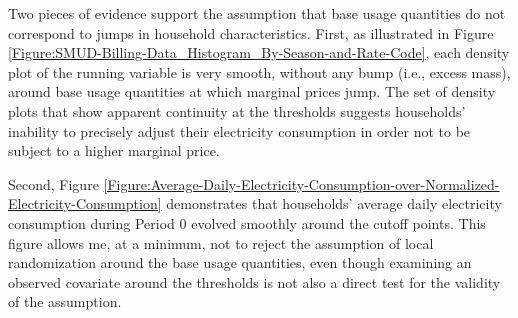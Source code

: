 Two pieces of evidence support the assumption that base usage quantities do not correspond to jumps in household characteristics. First, as illustrated in Figure \ref{Figure:SMUD-Billing-Data_Histogram_By-Season-and-Rate-Code}, each density plot of the running variable is very smooth, without any bump (i.e., excess mass), around base usage quantities at which marginal prices jump. The set of density plots that show apparent continuity at the thresholds suggests households' inability to precisely adjust their electricity consumption in order not to be subject to a higher marginal price. 

Second, Figure \ref{Figure:Average-Daily-Electricity-Consumption-over-Normalized-Electricity-Consumption} demonstrates that households' average daily electricity consumption during Period 0 evolved smoothly around the cutoff points. This figure allows me, at a minimum, not to reject the assumption of local randomization around the base usage quantities, even though examining an observed covariate around the thresholds is not also a direct test for the validity of the assumption. 
